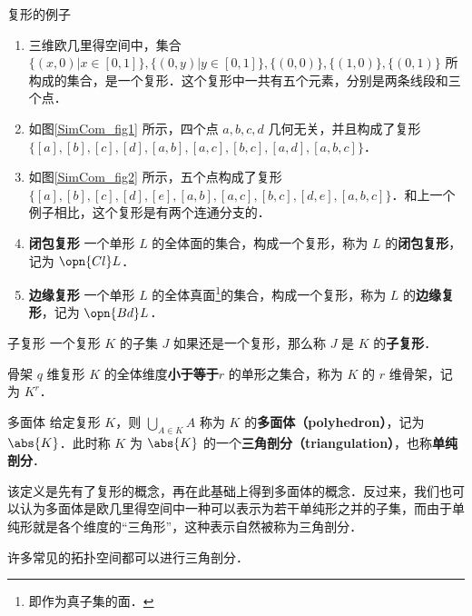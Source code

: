 \begin{example}{复形的例子}
\begin{enumerate}
\item 三维欧几里得空间中，集合 $\{(x, 0)|x\in[0,1]\}, \{(0, y)|y\in[0, 1]\}, \{(0, 0)\}, \{(1, 0)\}, \{(0, 1)\}$ 所构成的集合，是一个复形．这个复形中一共有五个元素，分别是两条线段和三个点．
\item 如图\autoref{SimCom_fig1} 所示，四个点 $a, b, c, d$ 几何无关，并且构成了复形 $\{[a], [b], [c], [d], [a, b], [a, c], [b, c], [a, d], [a, b, c]\}$．
\item 如图\autoref{SimCom_fig2} 所示，五个点构成了复形 $\{[a], [b], [c], [d], [e], [a, b], [a, c], [b, c], [d, e], [a, b, c]\}$．和上一个例子相比，这个复形是有两个连通分支的．
\item \textbf{闭包复形} 一个单形 $L$ 的全体面的集合，构成一个复形，称为 $L$ 的\textbf{闭包复形}，记为 $\opn{Cl} L$．
\item \textbf{边缘复形} 一个单形 $L$ 的全体真面\footnote{即作为真子集的面．}的集合，构成一个复形，称为 $L$ 的\textbf{边缘复形}，记为 $\opn{Bd} L$．
\end{enumerate}
\end{example}

\begin{definition}{子复形}
一个复形 $K$ 的子集 $J$ 如果还是一个复形，那么称 $J$ 是 $K$ 的\textbf{子复形}．
\end{definition}

\begin{definition}{骨架}
$q$ 维复形 $K$ 的全体维度\textbf{小于等于}$r$ 的单形之集合，称为 $K$ 的 $r$ 维骨架，记为 $K^r$．
\end{definition}

\begin{definition}{多面体}
给定复形 $K$，则 $\bigcup\limits_{A\in K}A$ 称为 $K$ 的\textbf{多面体（polyhedron）}，记为 $\abs{K}$．此时称 $K$ 为 $\abs{K}$ 的一个\textbf{三角剖分（triangulation）}，也称\textbf{单纯剖分}．
\end{definition}

该定义是先有了复形的概念，再在此基础上得到多面体的概念．反过来，我们也可以认为多面体是欧几里得空间中一种可以表示为若干单纯形之并的子集，而由于单纯形就是各个维度的“三角形”，这种表示自然被称为三角剖分．

许多常见的拓扑空间都可以进行三角剖分．

